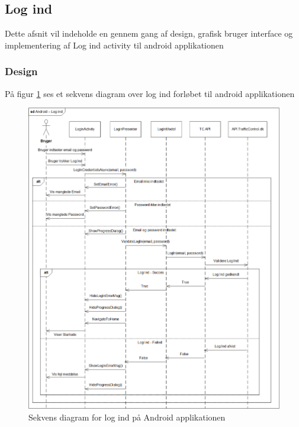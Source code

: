 	
	\subsection{Log ind}
	Dette afsnit vil indeholde en gennem gang af design, grafisk bruger interface og implementering af Log ind activity til android applikationen
	
	\clearpage
	
	\subsubsection{Design}
	På figur \ref{fig:Sekvens diagram for Log Ind Android} ses et sekvens diagram over log ind forløbet til android applikationen
	\begin{figure} [!ht]
		\begin{center}
			\includegraphics[width=1\textwidth]{Android/Billeder/SekvensDiagramLogInd}
		\end{center}
		\caption{Sekvens diagram for log ind på Android applikationen}
		\label{fig:Sekvens diagram for Log Ind Android}
	\end{figure}
	

